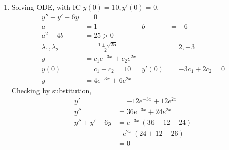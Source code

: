 \begin{enumerate}
    \item Solving ODE, with IC $ y(0) = 10, y'(0) = 0 $,
          \begin{align}
              y'' + y' - 6y            & = 0                            \\
              a                        & = 1                          &
              b                        & = -6                           \\
              a^{2} - 4b               & = 25 > 0                       \\
              \lambda_{1}, \lambda_{2} & = \frac{-1 \pm \sqrt{25}}{2} &
                                       & = 2, -3                        \\
              y                        & = c_{1}e^{-3x} + c_{2}e^{2x}   \\
              y(0)                     & = c_{1} + c_{2} = 10         &
              y'(0)                    & = -3c_{1} + 2c_{2} = 0         \\
              y                        & = 4e^{-3x} + 6e^{2x}
          \end{align}
          Checking by substitution,
          \begin{align}
              y'            & = -12e^{-3x} + 12e^{2x}  \\
              y''           & = 36e^{-3x} + 24e^{2x}   \\
              y'' + y' - 6y & = e^{-3x}\ (36 - 12 -24) \\
                            & + e^{2x}\ (24 + 12 - 26) \\
                            & = 0
          \end{align}


\end{enumerate}
